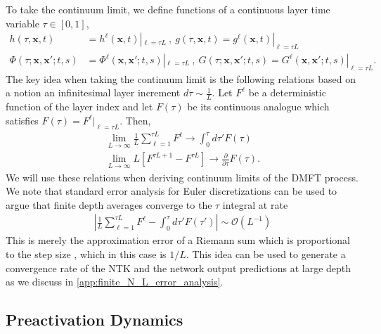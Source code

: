\documentclass{article} %
\def\x{\bm x}
\begin{document}
To take the continuum limit, we define functions of a continuous layer time variable $\tau \in [0,1]$, 
\begin{align}
    h(\tau,\x,t) &= h^\ell(\x,t)|_{\ell = \tau L }  \ , \ g(\tau,\x,t) = g^\ell(\x,t)|_{\ell= \tau L } \nonumber
    \\
    \Phi(\tau;\x,\x';t,s) &= \Phi^{\ell}(\x,\x';t,s)|_{\ell = \tau L} \ , \ G(\tau;\x,\x';t,s) = G^{\ell}(\x,\x';t,s)|_{\ell = \tau L} .
\end{align}
The key idea when taking the continuum limit is the following relations based on a notion an infinitesimal layer increment $d\tau \sim \frac{1}{L}$. Let $F^\ell$ be a deterministic function of the layer index and let $F(\tau)$ be its continuous analogue which satisfies $F(\tau) = F^\ell|_{\ell = \tau L}$. Then, 
\begin{align}
    \lim_{L \to \infty} \frac{1}{L} \sum_{\ell=1}^{\tau L} F^\ell \to \int_0^\tau d\tau' F(\tau) \nonumber
    \\
    \lim_{L \to \infty}  L \left[ F^{\tau L + 1} - F^{\tau L} \right] \to \frac{\partial}{\partial \tau} F(\tau) . 
\end{align}
We will use these relations when deriving continuum limits of the DMFT process. We note that standard error analysis for Euler discretizations can be used to argue that finite depth averages converge to the $\tau$ integral at rate
\begin{align}
    \left|\frac{1}{L} \sum_{\ell=1}^{\tau L} F^\ell-  \int_0^\tau d\tau' F(\tau') \right| \sim \mathcal{O}(L^{-1})
\end{align}
This is merely the approximation error of a Riemann sum which is proportional to the step size \citep{rudin1953principles}, which in this case is $1/L$. This idea can be used to generate a convergence rate of the NTK and the network output predictions at large depth as we discuss in \ref{app:finite_N_L_error_analysis}. 

\subsection{Preactivation Dynamics}
\end{document}
